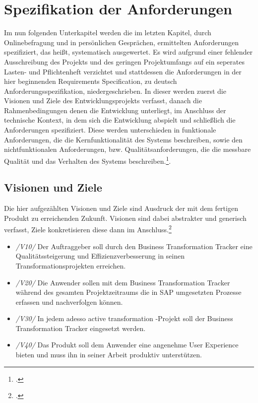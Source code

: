 \section{Spezifikation der Anforderungen}
Im nun folgenden Unterkapitel werden die im letzten Kapitel, durch Onlinebefragung und in persönlichen Gesprächen, ermittelten Anforderungen spezifiziert, das heißt, systematisch ausgewertet. Es wird aufgrund einer fehlender Ausschreibung des Projekts und des geringen Projektumfangs auf ein seperates Lasten- und Pflichtenheft verzichtet und stattdessen die Anforderungen in der hier beginnenden \glqq{}Requirements Specification\grqq{}, zu deutsch \glqq{}Anforderungsspezifikation\grqq{}, niedergeschrieben. In dieser werden zuerst die Visionen und Ziele des Entwicklungsprojekts verfasst, danach die Rahmenbedingungen denen die Entwicklung unterliegt, im Anschluss der technische Kontext, in dem sich die Entwicklung abspielt und schließlich die Anforderungen spezifiziert. Diese werden unterschieden in funktionale Anforderungen, die die Kernfunktionalität des Systems beschreiben, sowie den nichtfunktionalen Anforderungen, bzw. Qualitätsanforderungen, die die messbare Qualität und das Verhalten des Systems beschreiben.\footcite[Vgl.][S. 492 ff.]{balzert}. 

\subsection{Visionen und Ziele}
Die hier aufgezählten Visionen und Ziele sind Ausdruck der mit dem fertigen Produkt zu erreichenden Zukunft. Visionen sind dabei abstrakter und generisch verfasst, Ziele konkretisieren diese dann im Anschluss.\footcite[Vgl.][S. 457]{balzert}
\begin{itemize}
    \item[] \emph{/V10/} Der Auftraggeber soll durch den Business Transformation Tracker eine Qualitätssteigerung und Effizienzverbesserung in seinen Transformationsprojekten erreichen.
    \item[] \emph{/V20/} Die Anwender sollen mit dem Business Transformation Tracker während des gesamten Projektzeitraums die in SAP umgesetzten Prozesse erfassen und nachverfolgen können.
    \item[] \emph{/V30/} In jedem adesso active transformation -Projekt soll der Business Transformation Tracker eingesetzt werden.
    \item[] \emph{/V40/} Das Produkt soll dem Anwender eine angenehme User Experience bieten und muss ihn in seiner Arbeit produktiv unterstützen.\\
\end{itemize}


